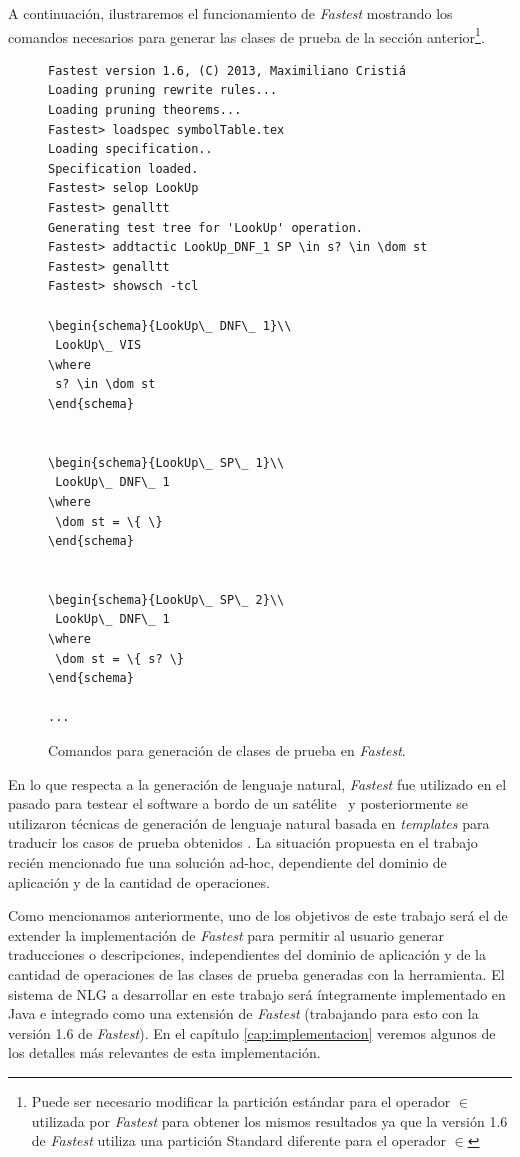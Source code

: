 A continuación, ilustraremos el funcionamiento de \emph{Fastest} mostrando los comandos necesarios para generar las clases de prueba de la sección anterior\footnote{Puede ser necesario modificar la partición estándar para el operador $\in$ utilizada por \emph{Fastest} para obtener los mismos resultados ya que la versión 1.6 de \emph{Fastest} utiliza una partición Standard diferente para el operador $\in$}.


\begin{figure}[H]
\begin{Verbatim}[frame=single,fontsize=\scriptsize]
Fastest version 1.6, (C) 2013, Maximiliano Cristiá
Loading pruning rewrite rules...
Loading pruning theorems...
Fastest> loadspec symbolTable.tex
Loading specification..
Specification loaded.
Fastest> selop LookUp
Fastest> genalltt 
Generating test tree for 'LookUp' operation.
Fastest> addtactic LookUp_DNF_1 SP \in s? \in \dom st
Fastest> genalltt                                    
Fastest> showsch -tcl

\begin{schema}{LookUp\_ DNF\_ 1}\\
 LookUp\_ VIS 
\where
 s? \in \dom st
\end{schema}


\begin{schema}{LookUp\_ SP\_ 1}\\
 LookUp\_ DNF\_ 1 
\where
 \dom st = \{ \}
\end{schema}


\begin{schema}{LookUp\_ SP\_ 2}\\
 LookUp\_ DNF\_ 1 
\where
 \dom st = \{ s? \}
\end{schema}

...
\end{Verbatim}
\caption{Comandos para generación de clases de prueba en \emph{Fastest}.}
\label{ej:comandos_fastest}
\end{figure}


En lo que respecta a la generación de lenguaje natural, \emph{Fastest} fue utilizado en el pasado para testear el software a bordo de un satélite~\cite{satelite} y posteriormente se utilizaron técnicas de generación de lenguaje natural basada en \textit{templates} para traducir los casos de prueba obtenidos \cite{cristia_pluss}. La situación propuesta en el trabajo recién mencionado fue una solución ad-hoc, dependiente del dominio de aplicación y de la cantidad de operaciones.


Como mencionamos anteriormente, uno de los objetivos de este trabajo será el de extender la implementación de \emph{Fastest} para permitir al usuario generar traducciones o descripciones, independientes del dominio de aplicación y de la cantidad de operaciones de las clases de prueba generadas con la herramienta.
El sistema de NLG a desarrollar en este trabajo será íntegramente implementado en Java e integrado como una extensión de \emph{Fastest} (trabajando para esto con la versión 1.6 de \emph{Fastest}). En el capítulo \ref{cap:implementacion} veremos algunos de los detalles más relevantes de esta implementación.

